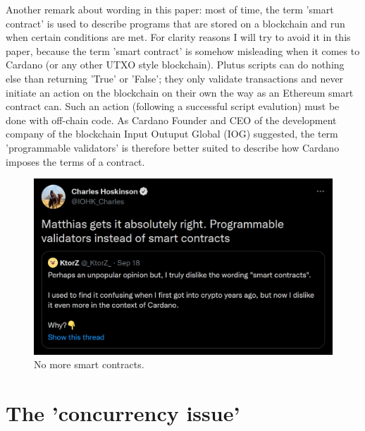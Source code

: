 \documentclass[a4paper,twoside,12pt]{report}
\begin{document}
Another remark about wording in this paper: most of time, the term 'smart contract' is used to describe programs that are stored on a blockchain and run when certain conditions are met. For clarity reasons I will try to avoid it in this paper, because the term 'smart contract' is somehow misleading when it comes to Cardano (or any other UTXO style blockchain). Plutus scripts can do nothing else than returning 'True' or 'False'; they only validate transactions and never initiate an action on the blockchain on their own the way as an Ethereum smart contract can. Such an action (following a successful script evalution) must be done with off-chain code. As Cardano Founder and CEO of the development company of the blockchain Input Outuput Global (IOG) suggested, the term 'programmable validators' is therefore better suited to describe how Cardano imposes the terms of a contract.   
\begin{figure}[h]
\centering
\includegraphics[scale=0.45]{programmable_validators}
\caption{No more smart contracts.}
\end{figure}

\section{The 'concurrency issue'}
\end{document}
